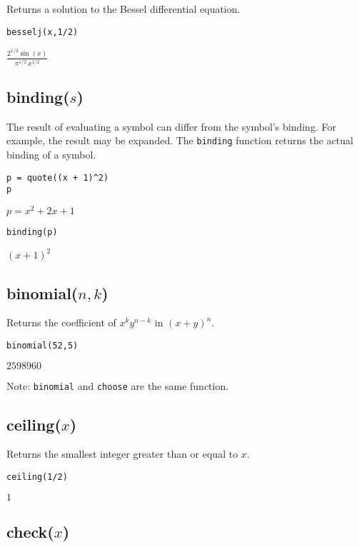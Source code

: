 Returns a solution to the Bessel differential equation.

{\color{blue}
\begin{verbatim}
besselj(x,1/2)
\end{verbatim}
}

\noindent
$\displaystyle \frac{2^{1/2}\sin(x)}{\pi^{1/2}\,x^{1/2}}$

\subsection*{binding($s$)}

The result of evaluating a symbol can differ from the symbol's binding.
For example, the result may be expanded.
The {\tt binding} function returns the actual binding of a symbol.

{\color{blue}
\begin{verbatim}
p = quote((x + 1)^2)
p
\end{verbatim}
}

\noindent
$p=x^2+2x+1$

{\color{blue}
\begin{verbatim}
binding(p)
\end{verbatim}
}

\noindent
$(x+1)^2$

\subsection*{binomial($n,k$)}

Returns the coefficient of $x^ky^{n-k}$ in $(x+y)^n$.

{\color{blue}
\begin{verbatim}
binomial(52,5)
\end{verbatim}
}

\noindent
$2598960$

\bigskip
\noindent
Note:
\verb$binomial$
and
\verb$choose$
are the same function.

\subsection*{ceiling($x$)}

Returns the smallest integer greater than or equal to $x$.

{\color{blue}
\begin{verbatim}
ceiling(1/2)
\end{verbatim}
}

\noindent
$1$

\subsection*{check($x$)}

